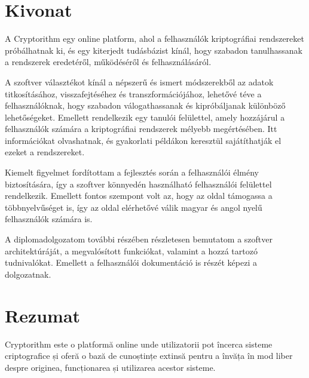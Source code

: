 
\hungarianParagraph


\chapter*{Kivonat}

A Cryptorithm egy online platform, ahol a felhasználók kriptográfiai rendszereket próbálhatnak ki, és egy kiterjedt tudásbázist kínál, hogy szabadon tanulhassanak a rendszerek eredetéről, működéséről és felhasználásáról.

A szoftver választékot kínál a népszerű és ismert módszerekből az adatok titkosításához, visszafejtéséhez és transzformációjához, lehetővé téve a felhasználóknak, hogy szabadon válogathassanak és kipróbáljanak különböző lehetőségeket. Emellett rendelkezik egy tanulói felülettel, amely hozzájárul a felhasználók számára a kriptográfiai rendszerek mélyebb megértésében. Itt információkat olvashatnak, és gyakorlati példákon keresztül sajátíthatják el ezeket a rendszereket. 

Kiemelt figyelmet fordítottam a fejlesztés során a felhasználói élmény biztosítására, így a szoftver könnyedén használható felhasználói felülettel rendelkezik. Emellett fontos szempont volt az, hogy az oldal támogassa a többnyelvűséget is, így az oldal elérhetővé válik magyar és angol nyelű felhasználók számára is.

A diplomadolgozatom további részében részletesen bemutatom a szoftver architektúráját, a megvalósított funkciókat, valamint a hozzá tartozó tudnivalókat. Emellett a felhasználói dokumentáció is részét képezi a dolgozatnak.


\vfill
{}

\chapter*{Rezumat}

Cryptorithm este o platformă online unde utilizatorii pot încerca sisteme criptografice și oferă o bază de cunoștințe extinsă pentru a învăța în mod liber despre originea, funcționarea și utilizarea acestor sisteme.

